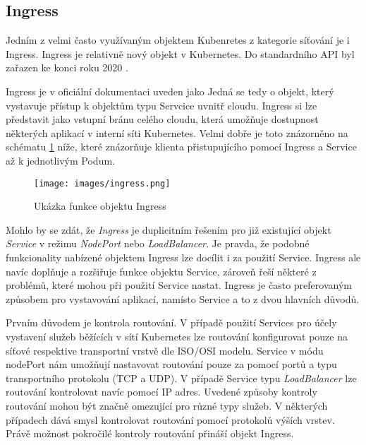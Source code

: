 \subsection{Ingress}
Jedním z velmi často využívaným objektem Kubenretes z kategorie síťování je i Ingress. Ingress je relativně nový objekt v Kubernetes. Do standardního API byl zařazen ke konci roku 2020 \cite{k8scirobot_2020_merge}.

Ingress je v oficiální dokumentaci uveden jako \textit{} \cite{thekubernetesauthors_2023_ingress} Jedná se tedy o objekt, který vystavuje přístup k objektům typu Servcice uvnitř cloudu. Ingress si lze představit jako vstupní bránu celého cloudu, která umožňuje dostupnost některých aplikací v interní síti Kubernetes. Velmi dobře je toto znázorněno na schématu \ref{fig:ingres} níže, které znázorňuje klienta přistupujícího pomocí Ingress a Service až k jednotlivým Podum.

\begin{figure}[!ht]
    \centering
    \texttt{[image: images/ingress.png]}
    \caption[Ukázka funkce objektu Ingress]{Ukázka funkce objektu Ingress \cite{thekubernetesauthors_2023_ingressdiagram}}
    \label{fig:ingres}
\end{figure}

Mohlo by se zdát, že \textit{Ingress} je duplicitním řešením pro již existující objekt \textit{Service} v režimu \textit{NodePort} nebo \textit{LoadBalancer}. Je pravda, že podobné funkcionality nabízené objektem Ingress lze docílit i za použití Service. Ingress ale navíc doplňuje a rozšiřuje funkce objektu Service, zároveň řeší některé z problémů, které mohou při použití Service nastat. Ingress je často preferovaným způsobem pro vystavování aplikací, namísto Service a to z dvou hlavních důvodů.

Prvním důvodem je kontrola routování. V případě použití Services pro účely vystavení služeb běžících v sítí Kubernetes lze routování konfigurovat pouze na síťové respektive transportní vrstvě dle ISO/OSI modelu. Service v módu nodePort nám umožňují nastavovat routování pouze za pomocí portů a typu transportního protokolu (TCP a UDP). V případě Service typu \textit{LoadBalancer} lze routování kontrolovat navíc pomocí IP adres. Uvedené způsoby kontroly routování mohou být značně omezující pro různé typy služeb. V některých případech dává smysl kontrolovat routování pomocí protokolů výších vrstev. Právě možnost pokročilé kontroly routování přináší objekt Ingress.

